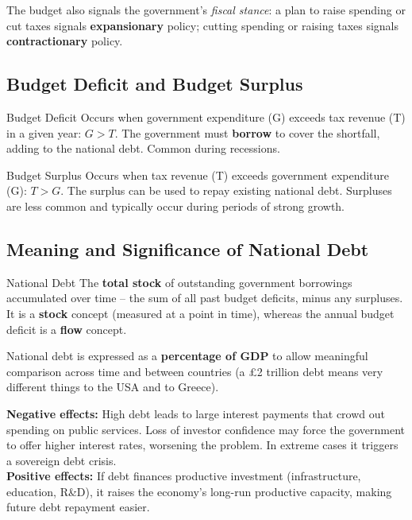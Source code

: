 \documentclass[11pt, a4paper, twoside]{book}
\begin{document}
The budget also signals the government's \emph{fiscal stance}: a plan to raise spending or cut taxes signals \textbf{expansionary} policy; cutting spending or raising taxes signals \textbf{contractionary} policy.

\subsection{Budget Deficit and Budget Surplus}

\begin{keyterm}{Budget Deficit}
Occurs when government expenditure (G) exceeds tax revenue (T) in a given year: $G > T$. The government must \textbf{borrow} to cover the shortfall, adding to the national debt. Common during recessions.
\end{keyterm}

\begin{keyterm}{Budget Surplus}
Occurs when tax revenue (T) exceeds government expenditure (G): $T > G$. The surplus can be used to repay existing national debt. Surpluses are less common and typically occur during periods of strong growth.
\end{keyterm}

\subsection{Meaning and Significance of National Debt}

\begin{keyterm}{National Debt}
The \textbf{total stock} of outstanding government borrowings accumulated over time -- the sum of all past budget deficits, minus any surpluses. It is a \textbf{stock} concept (measured at a point in time), whereas the annual budget deficit is a \textbf{flow} concept.
\end{keyterm}

National debt is expressed as a \textbf{percentage of GDP} to allow meaningful comparison across time and between countries (a \pounds2 trillion debt means very different things to the USA and to Greece).

\begin{example}
\textbf{Negative effects:} High debt leads to large interest payments that crowd out spending on public services. Loss of investor confidence may force the government to offer higher interest rates, worsening the problem. In extreme cases it triggers a sovereign debt crisis.\\[4pt]
\textbf{Positive effects:} If debt finances productive investment (infrastructure, education, R\&D), it raises the economy's long-run productive capacity, making future debt repayment easier.
\end{example}
\end{document}
